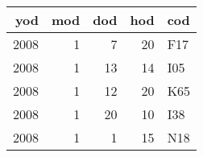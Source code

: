 \begin{tabular}{rrrrl}
\toprule
  yod &  mod &  dod &  hod &  cod \\
\midrule
 2008 &    1 &    7 &   20 &  F17 \\
 2008 &    1 &   13 &   14 &  I05 \\
 2008 &    1 &   12 &   20 &  K65 \\
 2008 &    1 &   20 &   10 &  I38 \\
 2008 &    1 &    1 &   15 &  N18 \\
\bottomrule
\end{tabular}
